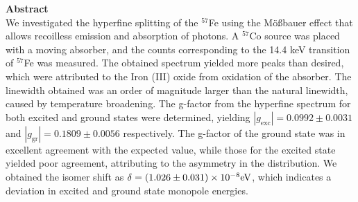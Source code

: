 \documentclass[a4paper]{report}
\numberwithin{equation}{section}
\begin{document}
\begin{titlepage}
	\vspace*{5em}

	\begin{minipage}{0.8\textwidth}
		\begin{centering}
			\textbf{Abstract}\\[0.2cm]
            We investigated the hyperfine splitting of the $^{57}$Fe using the M\"o{\ss}bauer effect that allows 
            recoilless emission and absorption of photons. A $^{57}$Co source was placed with a moving 
            absorber, and the counts corresponding to the 14.4 keV transition of $^{57}$Fe was measured. The 
            obtained spectrum yielded more peaks than desired, which were attributed to the Iron (III) oxide
            from oxidation of the absorber. The linewidth obtained was an order of magnitude larger than the natural 
            linewidth, caused by temperature broadening. The g-factor from the hyperfine spectrum for both excited and ground 
            states were determined, yielding $| g_\mathrm{exc} | = 0.0992 \pm 0.0031$ and $| g_\mathrm{gr} | = 0.1809 \pm 0.0056$
            respectively. The g-factor of the ground state was in excellent agreement with the expected value, while those for the 
            excited state yielded poor agreement, attributing to the asymmetry in the distribution. We obtained the 
            isomer shift as $\delta = \num[scientific-notation=true]{0.1026(31)e-7}\si[]{\electronvolt}$, which indicates a deviation in 
            excited and ground state monopole energies. 
		\end{centering}
	\end{minipage}
	
	
	
	
	
	
	 
	
	
\end{titlepage}
\end{document}
